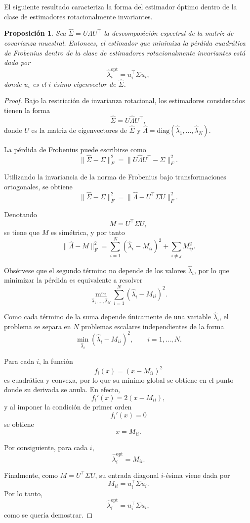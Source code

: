 \documentclass[letterpaper,12pt,oneside]{book}
\newtheorem{proposition}{Proposición}[section]
\begin{document}
El siguiente resultado caracteriza la forma del estimador óptimo dentro de la clase de estimadores rotacionalmente invariantes.

\begin{proposition}
Sea $\widehat{\Sigma} = U \Lambda U^\top$ la descomposición espectral de la matriz de covarianza muestral. Entonces, el estimador que minimiza la pérdida cuadrática de Frobenius dentro de la clase de estimadores rotacionalmente invariantes está dado por
\[
\widehat{\lambda}_i^{\mathrm{opt}} = u_i^\top \Sigma u_i,
\]
donde $u_i$ es el $i$-ésimo eigenvector de $\widehat{\Sigma}$.
\end{proposition}

\begin{proof}
Bajo la restricción de invarianza rotacional, los estimadores considerados tienen la forma
\[
\widehat{\Sigma} = U \widehat{\Lambda} U^\top,
\]
donde $U$ es la matriz de eigenvectores de $\widehat{\Sigma}$ y $\widehat{\Lambda} = \mathrm{diag}(\widehat{\lambda}_1,\dots,\widehat{\lambda}_N)$.

La pérdida de Frobenius puede escribirse como
\[
\|\widehat{\Sigma} - \Sigma\|_F^2
=
\|U \widehat{\Lambda} U^\top - \Sigma\|_F^2.
\]

Utilizando la invariancia de la norma de Frobenius bajo transformaciones ortogonales, se obtiene
\[
\|\widehat{\Sigma} - \Sigma\|_F^2
=
\|\widehat{\Lambda} - U^\top \Sigma U\|_F^2.
\]

Denotando
\[
M = U^\top \Sigma U,
\]
se tiene que $M$ es simétrica, y por tanto
\[
\|\widehat{\Lambda} - M\|_F^2
=
\sum_{i=1}^N (\widehat{\lambda}_i - M_{ii})^2
+
\sum_{i \neq j} M_{ij}^2.
\]

Obsérvese que el segundo término no depende de los valores $\widehat{\lambda}_i$, por lo que minimizar la pérdida es equivalente a resolver
\[
\min_{\widehat{\lambda}_1,\dots,\widehat{\lambda}_N}
\sum_{i=1}^N (\widehat{\lambda}_i-M_{ii})^2.
\]

Como cada término de la suma depende únicamente de una variable $\widehat{\lambda}_i$, el problema se separa en $N$ problemas escalares independientes de la forma
\[
\min_{\widehat{\lambda}_i} (\widehat{\lambda}_i-M_{ii})^2,
\qquad i=1,\dots,N.
\]

Para cada $i$, la función
\[
f_i(x)=(x-M_{ii})^2
\]
es cuadrática y convexa, por lo que su mínimo global se obtiene en el punto donde su derivada se anula. En efecto,
\[
f_i'(x)=2(x-M_{ii}),
\]
y al imponer la condición de primer orden
\[
f_i'(x)=0
\]
se obtiene
\[
x=M_{ii}.
\]

Por consiguiente, para cada $i$,
\[
\widehat{\lambda}_i^{\mathrm{opt}}=M_{ii}.
\]

Finalmente, como $M=U^\top \Sigma U$, su entrada diagonal $i$-ésima viene dada por
\[
M_{ii}=u_i^\top \Sigma u_i.
\]
Por lo tanto,
\[
\widehat{\lambda}_i^{\mathrm{opt}}=u_i^\top \Sigma u_i,
\]
como se quería demostrar.
\end{proof}
\end{document}
